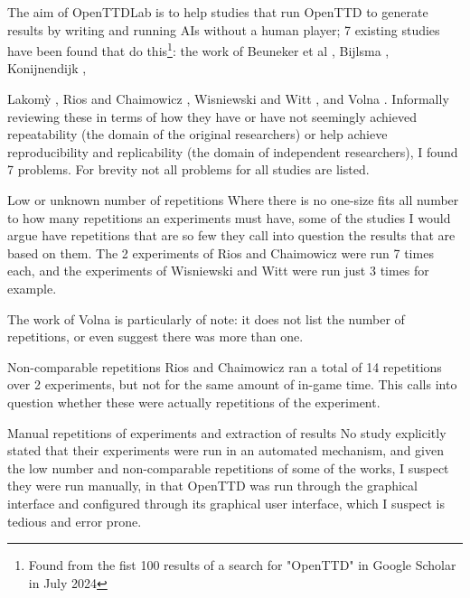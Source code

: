 \documentclass[logo,msc,dsti]{style/infthesis}    %
\newcommand{\singlespacedfootnote}[1]{{\singlespace\footnote{#1}}}
\begin{document}
The aim of OpenTTDLab is to help studies that run OpenTTD to generate results by writing and running AIs without a human player; 7 existing studies have been found that do this\singlespacedfootnote{Found from the fist 100 results of a search for "OpenTTD" in Google Scholar in July 2024}: the work of Beuneker et al \cite{beuneker2019autonomous}, Bijlsma \cite{bijlsma2014evolving}, Konijnendijk \cite{konijnendijk2015mcts}, {Lakom{\`y} \cite{lakomy2020railroad}, Rios and Chaimowicz \cite{rios2009trains}, Wisniewski and Witt \cite{wisniewski2011artificial}, and Volna \cite{volna2017fuzzy}. Informally reviewing these in terms of how they have or have not seemingly achieved repeatability (the domain of the original researchers) or help achieve reproducibility and replicability (the domain of independent researchers), I found 7 problems. For brevity not all problems for all studies are listed.

\begin{enumerate}
\begin{descitem}{Low or unknown number of repetitions}
Where there is no one-size fits all number to how many repetitions an experiments must have, some of the studies I would argue have repetitions that are so few they call into question the results that are based on them. The 2 experiments of Rios and Chaimowicz \cite{rios2009trains} were run 7 times each, and the experiments of Wisniewski and Witt \cite{wisniewski2011artificial} were run just 3 times for example.

The work of Volna \cite{volna2017fuzzy} is particularly of note: it does not list the number of repetitions, or even suggest there was more than one.
\end{descitem}
\begin{descitem}{Non-comparable repetitions}
Rios and Chaimowicz \cite{rios2009trains} ran a total of 14 repetitions over 2 experiments, but not for the same amount of in-game time. This calls into question whether these were actually repetitions of the experiment.
\end{descitem}
\begin{descitem}{Manual repetitions of experiments and extraction of results}
No study explicitly stated that their experiments were run in an automated mechanism, and given the low number and non-comparable repetitions of some of the works, I suspect they were run manually, in that OpenTTD was run through the graphical interface and configured through its graphical user interface, which I suspect is tedious and error prone.


\end{descitem}
\end{enumerate}}
\end{document}
